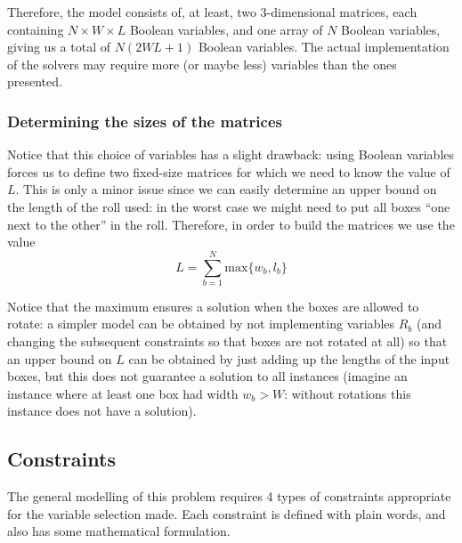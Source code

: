 Therefore, the model consists of, at least, two 3-dimensional matrices, each containing
$N \times W \times L$ Boolean variables, and one array of $N$ Boolean variables, giving
us a total of $N(2WL + 1)$ Boolean variables. The actual implementation of the solvers
may require more (or maybe less) variables than the ones presented.

\subsubsection{Determining the sizes of the matrices}
\label{sec:modelling:variables:value-L}

Notice that this choice of variables has a slight drawback: using Boolean variables forces us
to define two fixed-size matrices for which we need to know the value of $L$. This is only a
minor issue since we can easily determine an upper bound on the length of the roll used: in
the worst case we might need to put all boxes ``one next to the other'' in the roll. Therefore,
in order to build the matrices we use the value
\begin{equation}
\label{eq:upper-bound-L}
L = \sum_{b=1}^N \text{max}\{w_b, l_b\}
\end{equation}

Notice that the maximum ensures a solution when the boxes are allowed to rotate: a simpler
model can be obtained by not implementing variables $R_b$ (and changing the subsequent
constraints so that boxes are not rotated at all) so that an upper bound on $L$ can be
obtained by just adding up the lengths of the input boxes, but this does not guarantee
a solution to all instances (imagine an instance where at least one box had width $w_b > W$:
without rotations this instance does not have a solution).

\subsection{Constraints}
\label{sec:modelling:constraints}

The general modelling of this problem requires 4 types of constraints appropriate for the
variable selection made. Each constraint is defined with plain words, and also has some
mathematical formulation.

